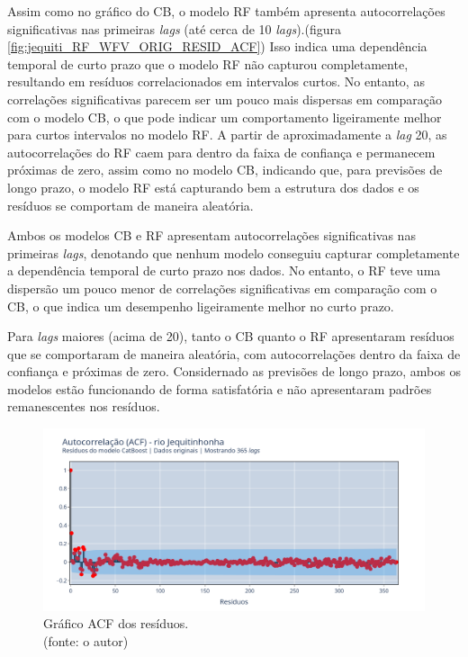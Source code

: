 Assim como no gráfico do CB, o modelo RF também apresenta autocorrelações significativas nas primeiras \textit{lags} (até cerca de 10 \textit{lags}).(figura \ref{fig:jequiti_RF_WFV_ORIG_RESID_ACF}) Isso indica uma dependência temporal de curto prazo que o modelo RF não capturou completamente, resultando em resíduos correlacionados em intervalos curtos. No entanto, as correlações significativas parecem ser um pouco mais dispersas em comparação com o modelo CB, o que pode indicar um comportamento ligeiramente melhor para curtos intervalos no modelo RF. A partir de aproximadamente a \textit{lag} 20, as autocorrelações do RF caem para dentro da faixa de confiança e permanecem próximas de zero, assim como no modelo CB, indicando que, para previsões de longo prazo, o modelo RF está capturando bem a estrutura dos dados e os resíduos se comportam de maneira aleatória.

Ambos os modelos CB e RF apresentam autocorrelações significativas nas primeiras \textit{lags}, denotando que nenhum modelo conseguiu capturar completamente a dependência temporal de curto prazo nos dados. No entanto, o RF teve uma dispersão um pouco menor de correlações significativas em comparação com o CB, o que indica um desempenho ligeiramente melhor no curto prazo.

Para \textit{lags} maiores (acima de 20), tanto o CB quanto o RF apresentaram resíduos que se comportaram de maneira aleatória, com autocorrelações dentro da faixa de confiança e próximas de zero. Considernado as previsões de longo prazo, ambos os modelos estão funcionando de forma satisfatória e não apresentaram padrões remanescentes nos resíduos.

\begin{figure}[!h]
\centering
\includegraphics[scale=0.33]{Figuras/jequiti/wfv/CB/CB_WFV_ORIG_RESID_ACF.png}
\caption{Gráfico ACF dos resíduos.\\(fonte: o autor)}
\label{fig:jequiti_CB_WFV_ORIG_RESID_ACF}
\end{figure}

